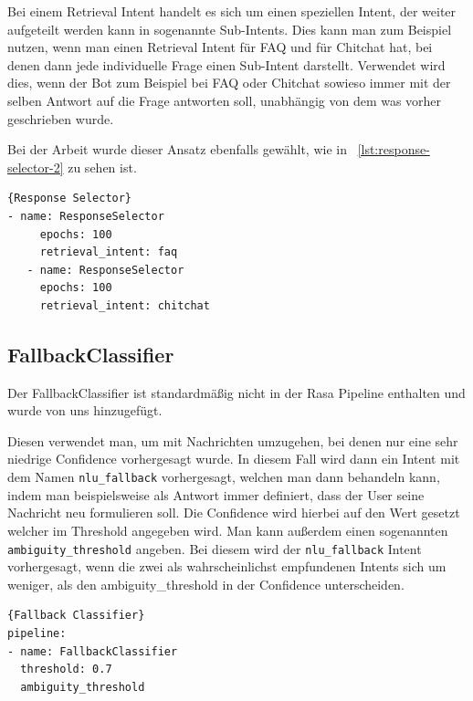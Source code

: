 Bei einem Retrieval Intent handelt es sich um einen speziellen Intent, der weiter aufgeteilt werden kann in sogenannte Sub-Intents.
Dies kann man zum Beispiel nutzen, wenn man einen Retrieval Intent für FAQ und für Chitchat hat, bei denen dann jede individuelle Frage einen Sub-Intent darstellt.\cite{retrievalIntent}
Verwendet wird dies, wenn der Bot zum Beispiel bei FAQ oder Chitchat sowieso immer mit der selben Antwort auf die Frage antworten soll, unabhängig von dem was vorher geschrieben wurde.\cite{chitchatAndFaqs}

Bei der Arbeit wurde dieser Ansatz ebenfalls gewählt, wie in ~\ref{lst:response-selector-2} zu sehen ist.

\begin{lstlisting}[label={lst:response-selector-2},caption={Response Selector für Chitchat und FAQ}]{Response Selector}
- name: ResponseSelector
     epochs: 100
     retrieval_intent: faq
   - name: ResponseSelector
     epochs: 100
     retrieval_intent: chitchat
\end{lstlisting}

\subsection{FallbackClassifier}

Der FallbackClassifier ist standardmäßig nicht in der Rasa Pipeline enthalten und wurde von uns hinzugefügt.\cite{startingPipelines}

Diesen verwendet man, um mit Nachrichten umzugehen, bei denen nur eine sehr niedrige Confidence vorhergesagt wurde.
In diesem Fall wird dann ein Intent mit dem Namen \texttt{nlu\_fallback} vorhergesagt, welchen man dann behandeln kann, indem man beispielsweise als Antwort immer definiert, dass der User seine Nachricht neu formulieren soll.
Die Confidence wird hierbei auf den Wert gesetzt welcher im Threshold angegeben wird.\cite{fallbackClassifier, nluFallback}
Man kann außerdem einen sogenannten \texttt{ambiguity\_threshold} angeben.
Bei diesem wird der \texttt{nlu\_fallback} Intent vorhergesagt, wenn die zwei als wahrscheinlichst empfundenen Intents sich um weniger, als den ambiguity\_threshold in der Confidence unterscheiden.\cite{fallbackClassifier}

\begin{lstlisting}[label={lst:fallback-classifier},caption={Fallback Classifier}]{Fallback Classifier}
pipeline:
- name: FallbackClassifier
  threshold: 0.7
  ambiguity_threshold
\end{lstlisting}


